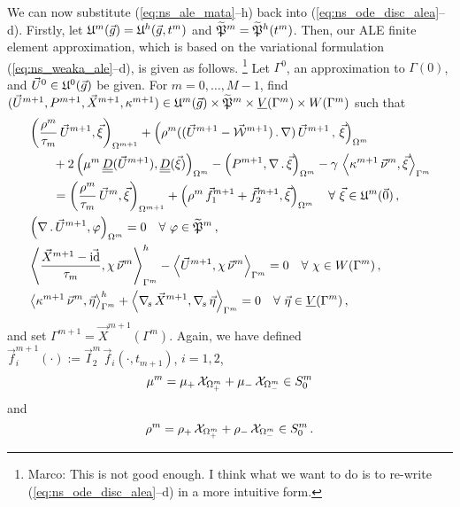 We can now substitute (\ref{eq:ns_ale_mata}--h) back into
(\ref{eq:ns_ode_disc_alea}--d). Firstly, let
$\uspacediscale{g}{m}=\uspacesemidiscale{g}{h}{t^m}$ and
$\pnormspaceale^m=\pnormspaceale^h(t^m)$. Then, our ALE finite element
approximation, which is based on the variational formulation
(\ref{eq:ns_weaka_ale}--d), is given as follows.
\footnote{Marco: This is not good enough. I think what we want to do is to
re-write (\ref{eq:ns_ode_disc_alea}--d) in a more intuitive form.}
Let $\Gamma^0$, an
approximation to $\Gamma(0)$, and $\vec U^0\in \uspacediscale{g}{0}$ be given.
For $m=0,\ldots, M-1$, find $(\vec U^{m+1},P^{m+1}, \vec X^{m+1}, \kappa^{m+1})
\in \uspacediscale{g}{m}\times \pnormspaceale^m \times \Vh \times \Wh$ such that
\begin{subequations}
\begin{align}
& \left( \frac{\rho^m}{\tau_m}\,\vec U^{m+1}, \vec \xi \right)_{\Omega^{m+1}}
+ \left(\rho^m( (\vec U^{m+1}- \W^{m+1})\,.\,\nabla)\,\vec U^{m+1}\,,
\,\vec \xi \right)_{\Omega^m}\nonumber \\
& \qquad + 2\left(\mu^m\,\mat D(\vec U^{m+1}), \mat D(\vec \xi)
\right)_{\Omega^m} - \left(P^{m+1}, \nabla\,.\,\vec \xi\right)_{\Omega^m}
- \gamma\,\left\langle \kappa^{m+1}\,\vec\nu^m , \vec\xi\right\rangle_{\Gamma^m}
\nonumber \\
& \qquad=  \left(\frac{\rho^m}{\tau_m}\,\vec U^m,\vec \xi \right)_{\Omega^{m+1}}
+ \left(\rho^m\,\vec f_1^{m+1}+\vec f_2^{m+1}, \vec \xi\right)_{\Omega^m}
\quad \forall\ \vec\xi \in \uspacediscale{0}{m}\,, \label{eq:ale_HGa} \\
& \left(\nabla\,.\,\vec U^{m+1}, \varphi\right)_{\Omega^m}  = 0
\quad \forall\ \varphi \in \pnormspaceale^m\,,\label{eq:ale_HGb} \\
&  \left\langle \frac{\vec X^{m+1} - \vec\id}{\tau_m} ,\chi\,\vec\nu^m
\right\rangle_{\Gamma^m}^h - \left\langle \vec U^{m+1}, \chi\,\vec\nu^m
\right\rangle_{\Gamma^m}  = 0 \quad \forall\ \chi \in \Wh\,,
\label{eq:ale_HGc}\\
& \left\langle \kappa^{m+1}\,\vec\nu^m, \vec\eta \right\rangle_{\Gamma^m}^h
+ \left\langle \nabs\,\vec X^{m+1}, \nabs\,\vec \eta \right\rangle_{\Gamma^m} =
0 \quad \forall\ \vec\eta \in \Vh\,, \label{eq:ale_HGd}
\end{align}
\end{subequations}
and set $\Gamma^{m+1} = \vec X^{m+1}(\Gamma^m)$. Again, we have defined
$\vec f_i^{m+1}(\cdot) := \vec I^m_2\,\vec f_i(\cdot,t_{m+1})$, $i=1,2$,
\begin{equation}
\mu^m = \mu_+\,\charfcn{\Omega^m_+} + \mu_-\,\charfcn{\Omega^m_-}\in S^m_0
\end{equation}
and
\begin{equation}
\rho^m = \rho_+\,\charfcn{\Omega^m_+} + \rho_-\,\charfcn{\Omega^m_-}\in S^m_0\,.
\end{equation}

